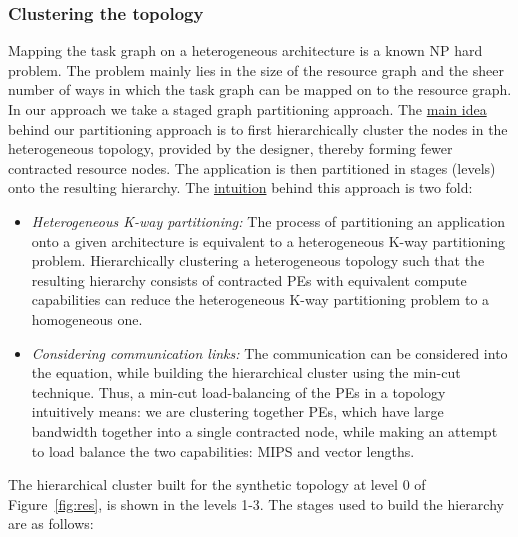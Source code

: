 \subsubsection{Clustering the topology}
\label{sec:clustering-topology}

Mapping the task graph on a heterogeneous architecture is a known NP
hard problem. The problem mainly lies in the size of the resource graph
and the sheer number of ways in which the task graph can be mapped on to
the resource graph. In our approach we take a staged graph partitioning
approach. The \underline{main idea} behind our partitioning approach is
to first hierarchically cluster the nodes in the heterogeneous topology,
provided by the designer, thereby forming fewer contracted resource
nodes. The application is then partitioned in stages (levels) onto the
resulting hierarchy. The \underline{intuition} behind this approach is
two fold:

\begin{itemize}

\item \textit{Heterogeneous K-way partitioning:} The process of
  partitioning an application onto a given architecture is equivalent to
  a heterogeneous K-way partitioning problem. Hierarchically clustering
  a heterogeneous topology such that the resulting hierarchy consists of
  contracted PEs with equivalent compute capabilities can reduce the
  heterogeneous K-way partitioning problem to a homogeneous one.

\item \textit{Considering communication links:} The communication can be
  considered into the equation, while building the hierarchical cluster
  using the min-cut technique. Thus, a min-cut load-balancing of the PEs
  in a topology intuitively means: we are clustering together PEs, which
  have large bandwidth together into a single contracted node, while
  making an attempt to load balance the two capabilities: MIPS and
  vector lengths.

\end{itemize}

The hierarchical cluster built for the synthetic topology at level 0 of
Figure~\ref{fig:res}, is shown in the levels 1-3. The stages used to
build the hierarchy are as follows:

